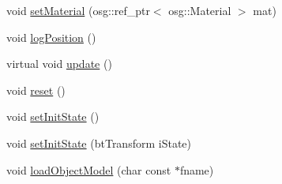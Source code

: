 \begin{DoxyCompactItemize}
\item 
void \mbox{\hyperlink{classbtosgObject_a6ab7b9e0553dab398b980637788b56a8}{set\+Material}} (osg\+::ref\+\_\+ptr$<$ osg\+::\+Material $>$ mat)
\item 
void \mbox{\hyperlink{classbtosgObject_acfd70fa6477c80fd7f29ad7ab9f4f067}{log\+Position}} ()
\item 
virtual void \mbox{\hyperlink{classbtosgObject_a342917817dfde62554f83da8e0d5110b}{update}} ()
\item 
void \mbox{\hyperlink{classbtosgObject_a93983f9180dd0672f8779cf2baa78580}{reset}} ()
\item 
void \mbox{\hyperlink{classbtosgObject_ad1508a0ce28cfac83e5f0ff6245f91b5}{set\+Init\+State}} ()
\item 
void \mbox{\hyperlink{classbtosgObject_a6ceb08e59ee95acaaef389ee198d2b56}{set\+Init\+State}} (bt\+Transform i\+State)
\item 
void \mbox{\hyperlink{classbtosgObject_a91838b8235579da178fcc06e6d3d47f3}{load\+Object\+Model}} (char const $\ast$fname)
\end{DoxyCompactItemize}
